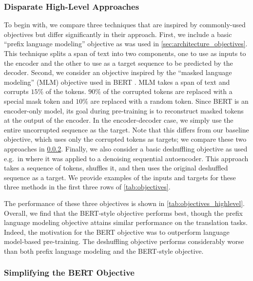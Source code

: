 \subsubsection{Disparate High-Level Approaches}
\label{sec:objectives_highlevel}

To begin with, we compare three techniques that are inspired by commonly-used objectives but differ significantly in their approach. First, we include a basic ``prefix language modeling'' objective as was used in \ref{sec:architecture_objectives}.
This technique splits a span of text into two components, one to use as inputs to the encoder and the other to use as a target sequence to be predicted by the decoder. Second, we consider an objective inspired by the ``masked language modeling'' (MLM) objective used in BERT \citep{devlin2018bert}. MLM takes a span of text and corrupts $15\%$ of the tokens.
$90\%$ of the corrupted tokens are replaced with a special mask token and $10\%$ are replaced with a random token. Since BERT is an encoder-only model, its goal during pre-training is to reconstruct masked tokens at the output of the encoder. In the encoder-decoder case, we simply use the entire uncorrupted sequence as the target. Note that this differs from our baseline objective, which uses only the corrupted tokens as targets; we compare these two approaches in \ref{sec:simplifying_bert}.
Finally, we also consider a basic deshuffling objective as used e.g.\ in \citep{liu2019summae} where it was applied to a denoising sequential autoencoder. This approach takes a sequence of tokens, shuffles it, and then uses the original deshuffled sequence as a target. We provide examples of the inputs and targets for these three methods in the first three rows of \ref{tab:objectives}.

The performance of these three objectives is shown in \ref{tab:objectives_highlevel}.
Overall, we find that the BERT-style objective performs best, though the prefix language modeling objective attains similar performance on the translation tasks. Indeed, the motivation for the BERT objective was to outperform language model-based pre-training. The deshuffling objective performs considerably worse than both prefix language modeling and the BERT-style objective.

\subsubsection{Simplifying the BERT Objective}
\label{sec:simplifying_bert}

